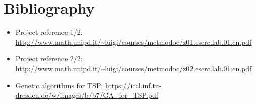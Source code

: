 \renewcommand{\thesection}{A}
\section{Bibliography}
	\begin{itemize}
		\item Project reference 1/2: {\color{blue}\url{http://www.math.unipd.it/~luigi/courses/metmodoc/z01.eserc.lab.01.en.pdf}}
		\item Project reference 2/2: {\color{blue}\url{http://www.math.unipd.it/~luigi/courses/metmodoc/z02.eserc.lab.01.en.pdf}}
		\item Genetic algorithms for TSP:  {\color{blue}\url{https://iccl.inf.tu-dresden.de/w/images/b/b7/GA_for_TSP.pdf}}
	\end{itemize}
	